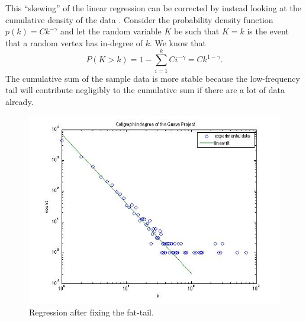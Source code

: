 \documentclass[11pt,a4paper,twocolumn]{article}
\begin{document}
\begin{singlespace}
This ``skewing'' of the linear regression can be corrected by instead looking at the
cumulative density of the data \cite{CLASS}. Consider the probability density function
$p(k) = C k^{-\gamma}$ and let the random variable $K$ be such that $K = k$ is the
event that a random vertex has in-degree of $k$. We know that
$$P(K > k) = 1 - \sum_{i = 1}^k Ci^{-\gamma} = Ck^{1 - \gamma}.$$
The cumulative sum of the sample data is more stable because the low-frequency
tail will contribute negligibly to the cumulative sum if there are a lot of data already.
\begin{figure}
\centering
\includegraphics[scale=0.4]{images/guava}
\caption{Regression after fixing the fat-tail.\label{fig:guava}}
\end{figure}


\end{singlespace}
\end{document}
